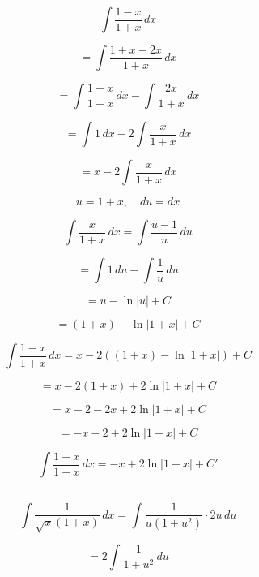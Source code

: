\documentclass[12pt]{article}
\begin{document}
\subsection{}


	\[
	\int \frac{1-x}{1+x} \, dx
	\]
	

	
	\[
	= \int \frac{1+x - 2x}{1+x} \, dx
	\]

	
	\[
	= \int \frac{1+x}{1+x} \, dx - \int \frac{2x}{1+x} \, dx
	\]
	

	
	\[
	= \int 1 \, dx - 2 \int \frac{x}{1+x} \, dx
	\]
	

	\[
	= x - 2 \int \frac{x}{1+x} \, dx
	\]
	

	
	\[
	u = 1 + x, \quad du = dx
	\]
	

	
	\[
	\int \frac{x}{1+x} \, dx = \int \frac{u-1}{u} \, du
	\]
	

	
	\[
	= \int 1 \, du - \int \frac{1}{u} \, du
	\]
	

	
	\[
	= u - \ln |u| + C
	\]
	

	
	\[
	= (1+x) - \ln |1+x| + C
	\]
	

	
	\[
	\int \frac{1-x}{1+x} \, dx = x - 2 \left( (1+x) - \ln |1+x| \right) + C
	\]
	

	
	\[
	= x - 2(1+x) + 2\ln |1+x| + C
	\]
	
	\[
	= x - 2 - 2x + 2\ln |1+x| + C
	\]
	
	\[
	= -x - 2 + 2\ln |1+x| + C
	\]
	

	
	\[
	\int \frac{1-x}{1+x} \, dx = -x + 2\ln |1+x| + C'
	\]
	


\subsection{}




	
	\[
	\int \frac{1}{\sqrt{x}(1+x)} \, dx = \int \frac{1}{u(1+u^2)} \cdot 2u \, du
	\]
	

	
	\[
	= 2 \int \frac{1}{1+u^2} \, du
	\]
	
\end{document}
